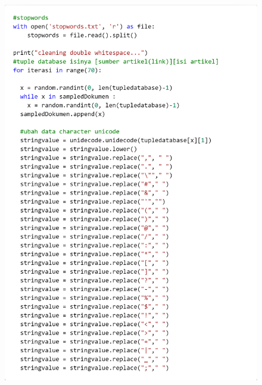 \documentclass[12pt]{report}
\begin{document}
\begin{figure}[H]
\centering
\includegraphics[scale=0.3]{onehotencode2}
\end{figure}
\end{document}
